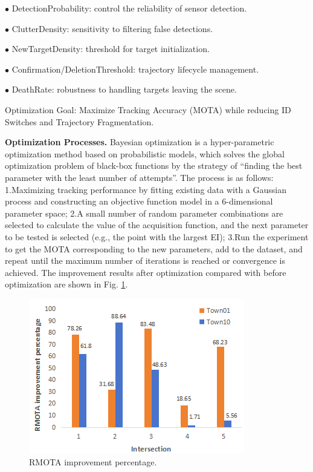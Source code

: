 \documentclass[lettersize,journal]{IEEEtran}
\begin{document}
\(\bullet\) DetectionProbability: control the reliability of sensor detection.

\(\bullet\) ClutterDensity: sensitivity to filtering false detections.

\(\bullet\) NewTargetDensity: threshold for target initialization.

\(\bullet\) Confirmation/DeletionThreshold: trajectory lifecycle management.

\(\bullet\) DeathRate: robustness to handling targets leaving the scene.

Optimization Goal: Maximize Tracking Accuracy (MOTA) while reducing ID Switches and Trajectory Fragmentation.

\textbf{Optimization Processes.}
Bayesian optimization is a hyper-parametric optimization method based on probabilistic models, which solves the global optimization problem of black-box functions by the strategy of “finding the best parameter with the least number of attempts”.
The process is as follows:
1.Maximizing tracking performance by fitting existing data with a Gaussian process and constructing an objective function model in a 6-dimensional parameter space; 
2.A small number of random parameter combinations are selected to calculate the value of the acquisition function, and the next parameter to be tested is selected (e.g., the point with the largest EI); 
3.Run the experiment to get the MOTA corresponding to the new parameters, add to the dataset, and repeat until the maximum number of iterations is reached or convergence is achieved.
The improvement results after optimization compared with before optimization are shown in Fig. \ref{fig:4}.   
\begin{figure}[t]
	\centering
	\includegraphics[width=\linewidth]{picture/picture4.png} 
	\caption{RMOTA improvement percentage.} 
	\label{fig:4} 
\end{figure}
\end{document}
